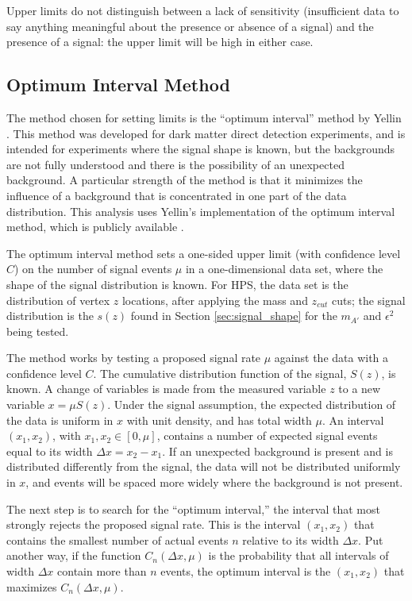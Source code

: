 Upper limits do not distinguish between a lack of sensitivity (insufficient data to say anything meaningful about the presence or absence of a signal) and the presence of a signal: the upper limit will be high in either case.

\subsection{Optimum Interval Method}
The method chosen for setting limits is the ``optimum interval'' method by Yellin \cite{yellin_finding_2002}.
This method was developed for dark matter direct detection experiments, and is intended for experiments where the signal shape is known, but the backgrounds are not fully understood and there is the possibility of an unexpected background.
A particular strength of the method is that it minimizes the influence of a background that is concentrated in one part of the data distribution.
This analysis uses Yellin's implementation of the optimum interval method, which is publicly available \cite{yellin_optimum_2011}.

The optimum interval method sets a one-sided upper limit (with confidence level $C$) on the number of signal events $\mu$ in a one-dimensional data set, where the shape of the signal distribution is known.
For HPS, the data set is the distribution of vertex $z$ locations, after applying the mass and $z_{cut}$ cuts; the signal distribution is the $s(z)$ found in Section \ref{sec:signal_shape} for the $m_{A'}$ and $\epsilon^2$ being tested.

The method works by testing a proposed signal rate $\mu$ against the data with a confidence level $C$.
The cumulative distribution function of the signal, $S(z)$, is known.
A change of variables is made from the measured variable $z$ to a new variable $x=\mu S(z)$.
Under the signal assumption, the expected distribution of the data is uniform in $x$ with unit density, and has total width $\mu$.
An interval $(x_1,x_2)$, with $x_1, x_2 \in [0,\mu]$, contains a number of expected signal events equal to its width $\Delta x = x_2-x_1$.
If an unexpected background is present and is distributed differently from the signal, the data will not be distributed uniformly in $x$, and events will be spaced more widely where the background is not present.

The next step is to search for the ``optimum interval,'' the interval that most strongly rejects the proposed signal rate.
This is the interval $(x_1,x_2)$ that contains the smallest number of actual events $n$ relative to its width $\Delta x$.
Put another way, if the function $C_n(\Delta x,\mu)$ is the probability that all intervals of width $\Delta x$ contain more than $n$ events, the optimum interval is the $(x_1,x_2)$ that maximizes $C_n(\Delta x,\mu)$.

